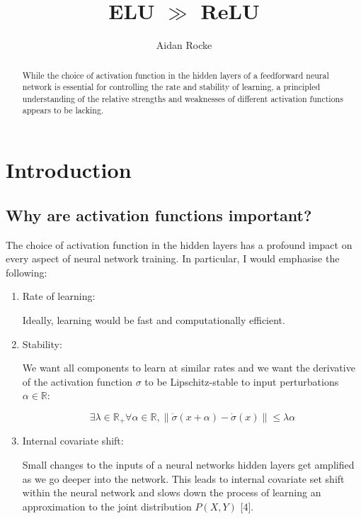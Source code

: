 \documentclass[11pt]{article}
\theoremstyle{plain}
\theoremstyle{definition}
\begin{document}
\title{ELU  $\gg$ ReLU}

\author{Aidan Rocke}
\maketitle

 \begin{abstract}
  While the choice of activation function in the hidden layers of a feedforward neural network is 
  essential for controlling the rate and stability of learning, a principled understanding of the
  relative strengths and weaknesses of different activation functions appears to be lacking.
\end{abstract}

\section{Introduction}

\subsection{Why are activation functions important?}

The choice of activation function in the hidden layers has a profound impact on every aspect of 
neural network training. In particular, I would emphasise the following:

\begin{enumerate}

\item{Rate of learning: 

Ideally, learning would be fast and computationally efficient. }

\item{Stability: 

We want all components to learn at similar rates and we want the 
derivative of the activation function $\sigma$ to be Lipschitz-stable to input perturbations $\alpha \in \mathbb{R}$:


\begin{equation}
\exists \lambda \in \mathbb{R}_{+}  \forall \alpha \in \mathbb{R}, \lVert \dot{\sigma}(x+\alpha)-\dot{\sigma}(x) \rVert \leq \lambda \alpha
\end{equation}


}

\item{Internal covariate shift:

Small changes to the inputs of a neural networks hidden layers get amplified
as we go deeper into the network. This leads to internal covariate set shift within
the neural network and slows down the process of learning an approximation 
to the joint distribution $P(X,Y)$ [4]. 
}

\end{enumerate}
\end{document}
